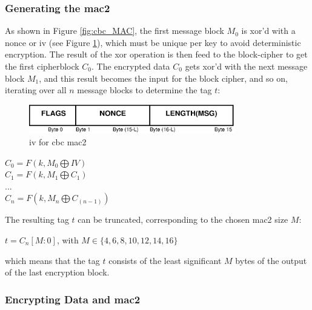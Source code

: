 \subsubsection{Generating the \gls{mac2}}

As shown in Figure \ref{fig:cbc_MAC}, the first message block $M_0$ is \gls{xor}'d with a nonce or \gls{iv} (see Figure
\ref{fig:ccrMacIV}), which must be unique per key to avoid deterministic encryption.
The result of the \gls{xor} operation is then feed to the block-cipher to get the first cipherblock $C_0$. The encrypted data $C_0$ gets \gls{xor}'d with the next message block $M_1$, and this
result becomes the input for the block cipher, and so on, iterating over all $n$ message blocks to determine the tag $t$:

\begin{figure}
    \centering
    \includegraphics[width=0.8\textwidth]{figures/CCMCBCIV.eps}
    \caption{\gls{iv} for \gls{cbc} \gls{mac2}}
    \label{fig:ccrMacIV}
\end{figure}


\begin{center}
 $C_0 = F(k, M_0 \bigoplus IV )$
 \\
 $C_1 = F(k, M_1 \bigoplus C_1) $
 \\
 $...$
 \\
 $C_n = F(k, M_n \bigoplus C_{(n-1)})$
 \\
\end{center}

The resulting tag $t$ can be truncated, corresponding to the chosen \gls{mac2} size $M$:
\begin{center}
  $t = C_n[M:0]$, with $M \in \{4, 6, 8, 10, 12, 14, 16\}$
\end{center}
which means that the tag $t$ consists of the least significant $M$ bytes of the output of the last encryption block.

\subsubsection{Encrypting Data and \gls{mac2}}

